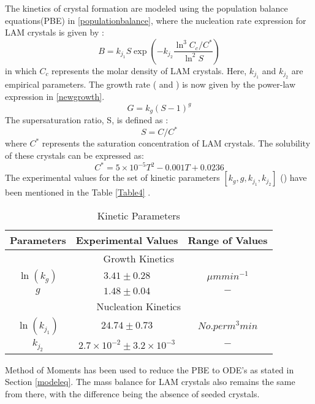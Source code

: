 \documentclass[3p,times,authoryear]{elsarticle}
\begin{document}
The kinetics of crystal formation are modeled using the population balance equations(PBE) in \ref{populationbalance}, where the nucleation rate expression for LAM crystals is given by \cite{lindenberg} :
\begin{equation}
B = k_{j_{1}}S\exp\left( -k_{j_{2}}\frac{\ln^{3}{C_{c}/C^{*}}}{\ln^{2}S}\right) 
\end{equation}
in which $C_{c}$ represents the  molar density of LAM crystals. Here, $k_{j_{1}}$ and $k_{j_{2}}$ are
empirical parameters. The growth rate (\cite{nagy} and \cite{nagy2}) is now given by the power-law expression in \ref{newgrowth}. 
\begin{equation}
G = k_{g}(S-1)^{g} \label{newgrowth}
\end{equation}
The supersaturation ratio, S, is defined as :
\begin{equation}
S = C/C^{*}
\end{equation}
where $C^{*}$ represents the saturation concentration of LAM crystals. The solubility of these crystals can be expressed as:
\begin{equation}
C^{*} = 5 \times 10^{-5}T^{2} - 0.001T + 0.0236
\end{equation}
The experimental values for the set of kinetic parameters $[k_{g}, g, k_{j_{1}}, k_{j_{2}}]$ (\cite{bhoi}) have been mentioned in the Table \ref{Table4} .

\begin{center}
\begin{table}[!h]
\centering 
\caption{Kinetic Parameters} \label{Table4}
\begin{tabular}{|c|c|c|}
\hline
Parameters & Experimental Values & Range of Values\\
\hline
\multicolumn{3}{|c|}{Growth Kinetics} \\
\hline
$\ln(k_{g})$ & $3.41\pm 0.28$ & $\mu m min^{-1} $\\
$g$ & $1.48\pm 0.04$ & $ - $\\
\hline
\multicolumn{3}{|c|}{Nucleation Kinetics} \\
\hline
$\ln(k_{j_{1}})$ & $24.74\pm0.73$ & $No. per m^{3}min$\\ 
$k_{j_{2}}$ & $2.7\times10^{-2}\pm 3.2\times10^{-3}$ & $-$\\
\hline
\end{tabular}

\label{values}
\end{table}
\end{center}

Method of Moments has been used to reduce the PBE to ODE's as stated in Section \ref{modeleq}. The mass balance for LAM crystals also remains the same from there, with the difference being the absence of seeded crystals.\\
\end{document}
